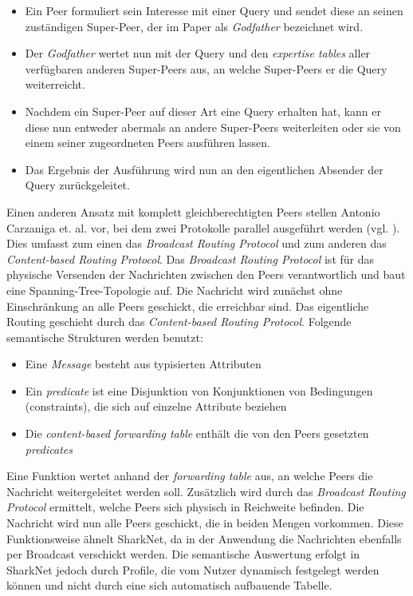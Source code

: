 \begin{itemize}
	\item Ein Peer formuliert sein Interesse mit einer Query und sendet diese an seinen zuständigen Super-Peer, der im Paper als \textit{Godfather} bezeichnet wird.
	\item Der \textit{Godfather} wertet nun mit der Query und den \textit{expertise tables} aller verfügbaren anderen Super-Peers aus, an welche Super-Peers er die Query weiterreicht.
	\item Nachdem ein Super-Peer auf dieser Art eine Query erhalten hat, kann er diese nun entweder abermals an andere Super-Peers weiterleiten oder sie von einem seiner zugeordneten Peers ausführen lassen.
	\item Das Ergebnis der Ausführung wird nun an den eigentlichen Absender der Query zurückgeleitet.\\
\end{itemize}
Einen anderen Ansatz mit komplett gleichberechtigten Peers stellen Antonio Carzaniga et. al. vor, bei dem zwei Protokolle parallel ausgeführt werden (vgl. \citet[S. 918ff]{Carzaniga2004}). Dies umfasst zum einen das \textit{Broadcast Routing Protocol} und zum anderen das \textit{Content-based Routing Protocol}. Das \textit{Broadcast Routing Protocol} ist für das physische Versenden der Nachrichten zwischen den Peers verantwortlich und baut eine Spanning-Tree-Topologie auf. Die Nachricht wird zunächst ohne Einschränkung an alle Peers geschickt, die erreichbar sind. Das eigentliche Routing geschieht durch das \textit{Content-based Routing Protocol}. Folgende semantische Strukturen werden benutzt:
\begin{itemize}
	\item Eine \textit{Message} besteht aus typisierten Attributen
	\item Ein \textit{predicate} ist eine Disjunktion von Konjunktionen von Bedingungen (constraints), die sich auf einzelne Attribute beziehen
	\item Die \textit{content-based forwarding table} enthält die von den Peers gesetzten \textit{predicates} 	
\end{itemize}
Eine Funktion wertet anhand der \textit{forwarding table} aus, an welche Peers die Nachricht weitergeleitet werden soll. Zusätzlich wird durch das \textit{Broadcast Routing Protocol} ermittelt, welche Peers sich physisch in Reichweite befinden. Die Nachricht wird nun alle Peers geschickt, die in beiden Mengen vorkommen. Diese Funktionsweise ähnelt SharkNet, da in der Anwendung die Nachrichten ebenfalls per Broadcast verschickt werden. Die semantische Auswertung erfolgt in SharkNet jedoch durch Profile, die vom Nutzer dynamisch festgelegt werden können und nicht durch eine sich automatisch aufbauende Tabelle.\\\\
